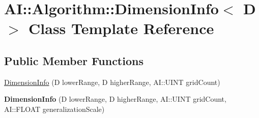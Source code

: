 \hypertarget{classAI_1_1Algorithm_1_1DimensionInfo}{\section{A\-I\-:\-:Algorithm\-:\-:Dimension\-Info$<$ D $>$ Class Template Reference}
\label{classAI_1_1Algorithm_1_1DimensionInfo}
}
\subsection*{Public Member Functions}
\begin{DoxyCompactItemize}
\item 
\hyperlink{classAI_1_1Algorithm_1_1DimensionInfo_a81474f419c3763f3de2833c8edb378c4}{Dimension\-Info} (D lower\-Range, D higher\-Range, A\-I\-::\-U\-I\-N\-T grid\-Count)
\item 
\hypertarget{classAI_1_1Algorithm_1_1DimensionInfo_a1401520e0bfb6e50b064ab0d94b8d5ec}{{\bfseries Dimension\-Info} (D lower\-Range, D higher\-Range, A\-I\-::\-U\-I\-N\-T grid\-Count, A\-I\-::\-F\-L\-O\-A\-T generalization\-Scale)}\label{classAI_1_1Algorithm_1_1DimensionInfo_a1401520e0bfb6e50b064ab0d94b8d5ec}


\end{DoxyCompactItemize}
